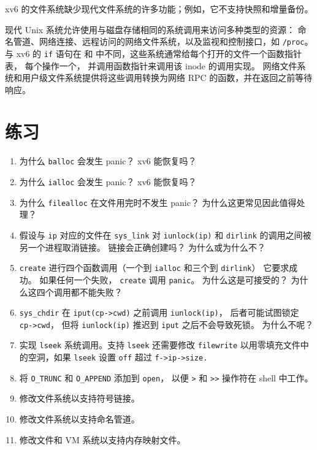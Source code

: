  xv6 的文件系统缺少现代文件系统的许多功能；例如，它不支持快照和增量备份。

现代 Unix 系统允许使用与磁盘存储相同的系统调用来访问多种类型的资源：
命名管道、网络连接、远程访问的网络文件系统，以及监视和控制接口，如
\lstinline{/proc}。
与 xv6 的
\lstinline{if}
语句在
和
中不同，这些系统通常给每个打开的文件一个函数指针表，
每个操作一个，
并调用函数指针来调用该 inode 的调用实现。
网络文件系统和用户级文件系统提供将这些调用转换为网络 RPC 的函数，并在返回之前等待响应。
\section{练习}

\begin{enumerate}

\item 为什么
\lstinline{balloc}
会发生 panic？
xv6 能恢复吗？

\item 为什么
\lstinline{ialloc}
会发生 panic？
xv6 能恢复吗？

\item 为什么
\lstinline{filealloc}
在文件用完时不发生 panic？
为什么这更常见因此值得处理？

\item 假设与
\lstinline{ip}
对应的文件在
\lstinline{sys_link}
对
\lstinline{iunlock(ip)}
和
\lstinline{dirlink}
的调用之间被另一个进程取消链接。
链接会正确创建吗？
为什么或为什么不？

\item
\lstinline{create}
进行四个函数调用（一个到
\lstinline{ialloc}
和三个到
\lstinline{dirlink}）
它要求成功。
如果任何一个失败，
\lstinline{create}
调用
\lstinline{panic}。
为什么这是可接受的？
为什么这四个调用都不能失败？

\item
\lstinline{sys_chdir}
在
\lstinline{iput(cp->cwd)}
之前调用
\lstinline{iunlock(ip)}，
后者可能试图锁定
\lstinline{cp->cwd}，
但将
\lstinline{iunlock(ip)}
推迟到
\lstinline{iput}
之后不会导致死锁。
为什么不呢？

\item 实现
\lstinline{lseek}
系统调用。支持
\lstinline{lseek}
还需要修改
\lstinline{filewrite}
以用零填充文件中的空洞，如果
\lstinline{lseek}
设置
\lstinline{off}
超过
\lstinline{f->ip->size.}

\item 将
\lstinline{O_TRUNC}
和
\lstinline{O_APPEND}
添加到
\lstinline{open}，
以便
\lstinline{>}
和
\lstinline{>>}
操作符在 shell 中工作。

\item 修改文件系统以支持符号链接。

\item 修改文件系统以支持命名管道。

\item 修改文件和 VM 系统以支持内存映射文件。

\end{enumerate}

